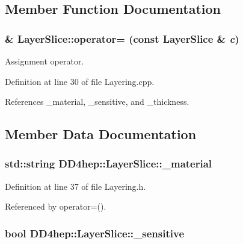\subsection{Member Function Documentation}
\hypertarget{class_d_d4hep_1_1_layer_slice_a1470bda72281650117b371db0efe485a}{
\subsubsection[{operator=}]{ \& LayerSlice::operator= (const {\bf LayerSlice} \& {\em c})}}
\label{class_d_d4hep_1_1_layer_slice_a1470bda72281650117b371db0efe485a}


Assignment operator. 

Definition at line 30 of file Layering.cpp.

References \_\-material, \_\-sensitive, and \_\-thickness.

\subsection{Member Data Documentation}
\hypertarget{class_d_d4hep_1_1_layer_slice_a32cd34749a18cc5d57c7a1546f5399fd}{
\subsubsection[{\_\-material}]{\setlength{\rightskip}{0pt plus 5cm}std::string {\bf DD4hep::LayerSlice::\_\-material}}}
\label{class_d_d4hep_1_1_layer_slice_a32cd34749a18cc5d57c7a1546f5399fd}


Definition at line 37 of file Layering.h.

Referenced by operator=().\hypertarget{class_d_d4hep_1_1_layer_slice_a0fd1f573e7323cd250cf874aca8e2575}{
\subsubsection[{\_\-sensitive}]{\setlength{\rightskip}{0pt plus 5cm}bool {\bf DD4hep::LayerSlice::\_\-sensitive}}}
\label{class_d_d4hep_1_1_layer_slice_a0fd1f573e7323cd250cf874aca8e2575}


